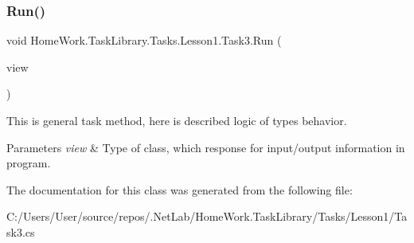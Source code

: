 \subsubsection{\texorpdfstring{Run()}{Run()}}
{\footnotesize\ttfamily void Home\+Work.\+Task\+Library.\+Tasks.\+Lesson1.\+Task3.\+Run (\begin{DoxyParamCaption}\item[{I\+Information}]{view }\end{DoxyParamCaption})}



This is general task method, here is described logic of types behavior. 


\begin{DoxyParams}{Parameters}
{\em view} & Type of class, which response for input/output information in program.\\
\hline
\end{DoxyParams}


The documentation for this class was generated from the following file\+:\begin{DoxyCompactItemize}
\item 
C\+:/\+Users/\+User/source/repos/.\+Net\+Lab/\+Home\+Work.\+Task\+Library/\+Tasks/\+Lesson1/Task3.\+cs\end{DoxyCompactItemize}
